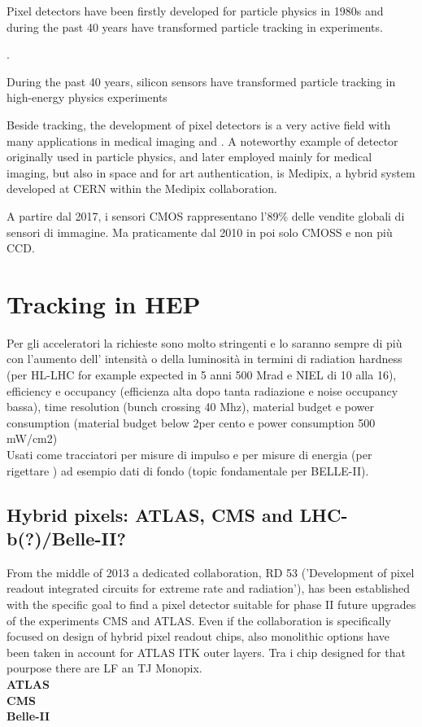 Pixel detectors have been firstly developed for particle physics in 1980s and during the past 40 years have transformed particle tracking in experiments.

.

During the past 40 years, silicon sensors have transformed particle tracking in high-energy physics experiments

Beside tracking, the development of pixel detectors is a very active field with many applications in medical imaging and .
A noteworthy example of detector originally used in particle physics, and later employed mainly for medical imaging, but also in space and for art authentication, is Medipix, a hybrid system developed at CERN within the Medipix collaboration.

A partire dal 2017, i sensori CMOS rappresentano l'89\% delle vendite globali di sensori di immagine. Ma praticamente dal 2010 in poi solo CMOSS e non più CCD.\\

\section{Tracking in HEP}
    Per gli acceleratori la richieste sono molto stringenti e lo saranno sempre di più con l'aumento dell' intensità o della luminosità in termini di radiation hardness (per HL-LHC for example expected in 5 anni 500 Mrad e NIEL di 10 alla 16), efficiency e occupancy (efficienza alta dopo tanta radiazione e noise occupancy bassa), time resolution (bunch crossing 40 Mhz), material budget e power consumption (material budget below 2per cento e power consumption 500 mW/cm2)\\
    Usati come tracciatori per misure di impulso e per misure di energia (per rigettare ) ad esempio dati di fondo (topic fondamentale per BELLE-II).

    \subsection{Hybrid pixels: ATLAS, CMS and LHC-b(?)/Belle-II?}
        From the middle of 2013 a dedicated collaboration, RD 53 ('Development of pixel readout integrated circuits for extreme rate and radiation'), has been established with the specific goal to find a pixel detector suitable for phase II future upgrades of the experiments CMS and ATLAS. Even if the collaboration is specifically focused on design of hybrid pixel readout chips, also monolithic options have been taken in account for ATLAS ITK outer layers. Tra i chip designed for that pourpose there are LF an TJ Monopix.\\
        \textbf{ATLAS}\\
        \textbf{CMS}\\
        \textbf{Belle-II}\\

